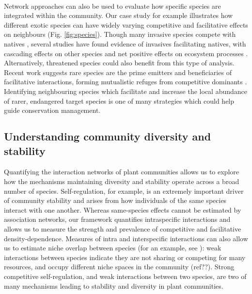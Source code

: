 \documentclass[a4,12pt]{article}
\begin{document}
        \paragraph{}
        Network approaches can also be used to evaluate how specific species are integrated within the community. Our case study for example illustrates how different exotic species can have widely varying competitive and facilitative effects on neighbours (Fig. \ref{fig:species}). Though many invasive species compete with natives \citep{Naeem2000, Riley2008, Zheng2015}, several studies have found evidence of invasives facilitating natives, with cascading effects on other species and net positive effects on ecosystem processes \citep{Rodriguez2006, Ramus2017}. Alternatively, threatened species could also benefit from this type of analysis. Recent work suggests rare species are the prime emitters and beneficiaries of facilitative interactions, forming mutualistic refuges from competitive dominants \citep{Calatayud2019, Hines2020}. Identifying neighbouring species which facilitate and increase the local abundance of rarer, endangered target species is one of many strategies which could help guide conservation management.


    \subsection{Understanding community diversity and stability}

        \paragraph{}
        Quantifying the interaction networks of plant communities allows us to explore how the mechanisms maintaining diversity and stability operate across a broad number of species. Self-regulation, for example, is an extremely important driver of community stability \citep{Barabas2017} and arises from how individuals of the same species interact with one another. Whereas same-species effects cannot be estimated by association networks, our framework quantifies intraspecific interactions and allows us to measure the strength and prevalence of competitive and facilitative density-dependence. Measures of intra and interspecific interactions can also allow us to estimate niche overlap between species (for an example, see \citet{Chu2015a}): weak interactions between species indicate they are not sharing or competing for many resources, and occupy different niche spaces in the community (ref??). Strong competitive self-regulation, and weak interactions between two species, are two of many mechanisms leading to stability and diversity in plant communities.
\end{document}
